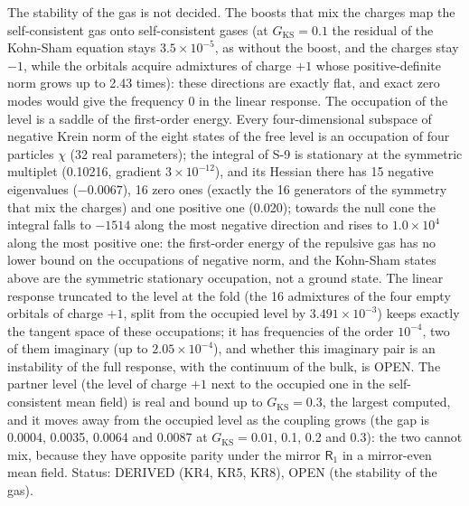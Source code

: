 \documentclass[
  10pt,
]{article}
\begin{document}
The stability of the gas is not decided. The boosts that mix the charges
map the self-consistent gas onto self-consistent gases (at
\(G_{\mathrm{KS}} = 0.1\) the residual of the Kohn-Sham equation stays
\(3.5\times10^{-5}\), as without the boost, and the charges stay \(-1\),
while the orbitals acquire admixtures of charge \(+1\) whose
positive-definite norm grows up to 2.43 times): these directions are
exactly flat, and exact zero modes would give the frequency 0 in the
linear response. The occupation of the level is a saddle of the
first-order energy. Every four-dimensional subspace of negative Krein
norm of the eight states of the free level is an occupation of four
particles \(\chi\) (32 real parameters); the integral of S-9 is
stationary at the symmetric multiplet (0.10216, gradient
\(3\times10^{-12}\)), and its Hessian there has 15 negative eigenvalues
(\(-0.0067\)), 16 zero ones (exactly the 16 generators of the symmetry
that mix the charges) and one positive one (0.020); towards the null
cone the integral falls to \(-1514\) along the most negative direction
and rises to \(1.0\times10^4\) along the most positive one: the
first-order energy of the repulsive gas has no lower bound on the
occupations of negative norm, and the Kohn-Sham states above are the
symmetric stationary occupation, not a ground state. The linear response
truncated to the level at the fold (the 16 admixtures of the four empty
orbitals of charge \(+1\), split from the occupied level by
\(3.491\times10^{-3}\)) keeps exactly the tangent space of these
occupations; it has frequencies of the order \(10^{-4}\), two of them
imaginary (up to \(2.05\times10^{-4}\)), and whether this imaginary pair
is an instability of the full response, with the continuum of the bulk,
is OPEN. The partner level (the level of charge \(+1\) next to the
occupied one in the self-consistent mean field) is real and bound up to
\(G_{\mathrm{KS}} = 0.3\), the largest computed, and it moves away from
the occupied level as the coupling grows (the gap is 0.0004, 0.0035,
0.0064 and 0.0087 at \(G_{\mathrm{KS}} = 0.01\), 0.1, 0.2 and 0.3): the
two cannot mix, because they have opposite parity under the mirror
\(\mathsf{R}_1\) in a mirror-even mean field. Status: DERIVED (KR4, KR5,
KR8), OPEN (the stability of the gas).
\end{document}
